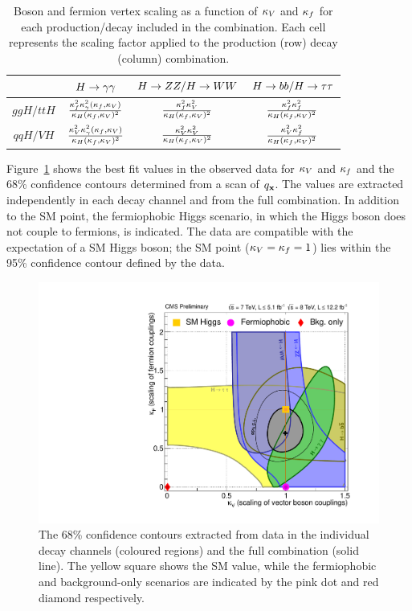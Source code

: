 \begin{table}
\begin{tabular}{|c|c|c|c|}
\hline
 & $H\rightarrow\gamma\gamma$ & $H\rightarrow ZZ / H\rightarrow WW$ & $H\rightarrow bb / H\rightarrow\tau\tau$ \\
\hline
$ggH/ttH$ & $\frac{\kappa_{f}^{2}\kappa_{\gamma}^{2}(\kappa_{f},\kappa_{V})}{\kappa_{H}(\kappa_{f},\kappa_{V})^{2}}$ & 
	    $\frac{\kappa_{f}^{2}\kappa_{V}^{2}}{\kappa_{H}(\kappa_{f},\kappa_{V})^{2}}$ & $\frac{\kappa_{f}^{2}\kappa_{f}^{2}}{\kappa_{H}(\kappa_{f},\kappa_{V})^{2}}$ \\
\hline
$qqH/VH$ &  $\frac{\kappa_{V}^{2}\kappa_{\gamma}^{2}(\kappa_{f},\kappa_{V})}{\kappa_{H}(\kappa_{f},\kappa_{V})^{2}}$ & 
	    $\frac{\kappa_{V}^{2}\kappa_{V}^{2}}{\kappa_{H}(\kappa_{f},\kappa_{V})^{2}}$ & $\frac{\kappa_{V}^{2}\kappa_{f}^{2}}{\kappa_{H}(\kappa_{f},\kappa_{V})^{2}}$ \\
\hline
\end{tabular}
\caption{Boson and fermion vertex scaling as a function of $\kappa_{V}$ and $\kappa_{f}$ 
for each production/decay included in the combination. Each cell represents the scaling 
factor applied to the production (row) decay (column) combination.}
\label{tab:kvkf}
\end{table}

Figure~\ref{fig:kvkf} shows the best fit values in the observed data 
for $\kappa_{V}$ and $\kappa_{f}$ and the 68\% confidence contours determined from a scan of $q_{\mathbf{x}}$.
The values are extracted independently in each decay channel and from the
full combination. In addition to the SM point, the fermiophobic Higgs scenario,
in which the Higgs boson does not couple to fermions, is indicated.
The data are compatible with the expectation of a SM Higgs boson; the SM 
point ($\kappa_{V}=\kappa_{f}=1$) lies within the 95\% confidence contour defined by the data.

\begin{figure}
\includegraphics[width=.8\textwidth]{combinations/Figure_014-b.pdf}
\caption{The 68\% confidence contours extracted from data in the 
individual decay channels (coloured regions) and the full 
combination (solid line). The yellow square shows the SM value, while
the fermiophobic and background-only scenarios are indicated
by the pink dot and red diamond respectively.}
\label{fig:kvkf}
\end{figure}
